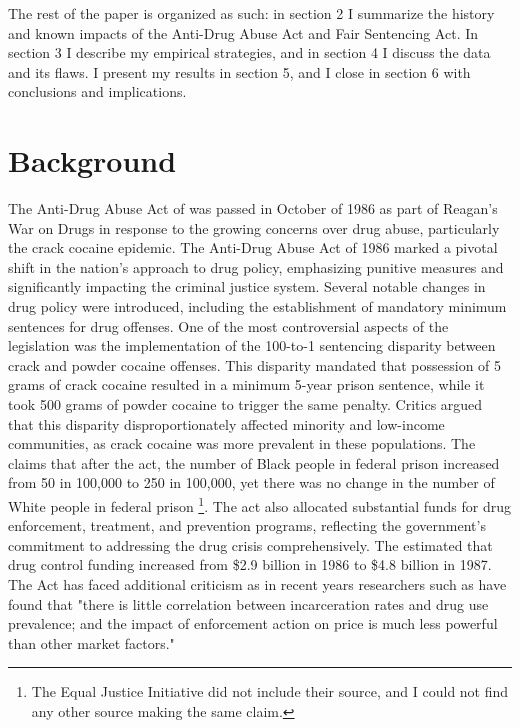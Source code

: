 \documentclass{article}
\begin{document}
The rest of the paper is organized as such: in section 2 I summarize the history and known impacts of the Anti-Drug Abuse Act and Fair Sentencing Act. In section 3 I describe my empirical strategies, and in section 4 I discuss the data and its flaws. I present my results in section 5, and I close in section 6 with conclusions and implications.

\section{Background}

The Anti-Drug Abuse Act of \citeyear{antidrugabuseact1986} was passed in October of 1986 as part of Reagan's War on Drugs in response to the growing concerns over drug abuse, particularly the crack cocaine epidemic. The Anti-Drug Abuse Act of 1986 marked a pivotal shift in the nation's approach to drug policy, emphasizing punitive measures and significantly impacting the criminal justice system. Several notable changes in drug policy were introduced, including the establishment of mandatory minimum sentences for drug offenses. One of the most controversial aspects of the legislation was the implementation of the 100-to-1 sentencing disparity between crack and powder cocaine offenses. This disparity mandated that possession of 5 grams of crack cocaine resulted in a minimum 5-year prison sentence, while it took 500 grams of powder cocaine to trigger the same penalty. Critics argued that this disparity disproportionately affected minority and low-income communities, as crack cocaine was more prevalent in these populations. The \cite{eji} claims that after the act, the number of Black people in federal prison increased from 50 in 100,000 to 250 in 100,000, yet there was no change in the number of White people in federal prison \footnote{The Equal Justice Initiative did not include their source, and I could not find any other source making the same claim.}. The act also allocated substantial funds for drug enforcement, treatment, and prevention programs, reflecting the government's commitment to addressing the drug crisis comprehensively. The \cite{drug_control_money} estimated that drug control funding increased from \$2.9 billion in 1986 to \$4.8 billion in 1987. The Act has faced additional criticism as in recent years researchers such as \cite{bewley2005incarceration} have found that "there is little correlation between incarceration rates and drug use prevalence; and the impact of enforcement action on price is much less powerful than other market factors."
\end{document}
